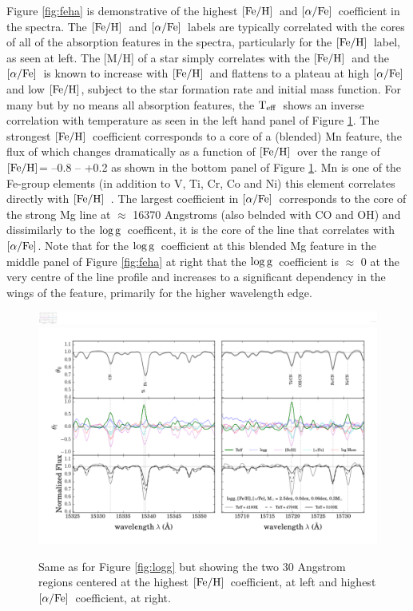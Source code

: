 \documentclass[12pt, preprint]{aastex}
\newcommand{\teff}{\mbox{$\rm T_{eff}$}}
\newcommand{\feh}{\mbox{$\rm [Fe/H]$}}
\newcommand{\alphafe}{\mbox{$\rm [\alpha/Fe]$}}
\newcommand{\logg}{\mbox{$\rm \log g$}}
\begin{document}
Figure \ref{fig:feha} is demonstrative of the highest \feh\ and \alphafe\ coefficient in the spectra. The \feh\ and \alphafe\ labels are typically correlated with the cores of all of the absorption features in the spectra, particularly for the \feh\ label, as seen at left. The [M/H] of  a star simply correlates with the \feh\ and the \alphafe\ is known to increase with \feh\ and flattens to a plateau at high \alphafe and low \feh, subject to the star formation rate and initial mass function. For many but by no means all absorption features, the \teff\ shows an inverse correlation with temperature as seen in the left hand panel of Figure \ref{fig:teff}. The strongest \feh\ coefficient corresponds to a core of a (blended) Mn feature, the flux of which changes dramatically as a function of \feh\ over the range of \feh = --0.8 -- +0.2 as shown in the bottom panel of Figure \ref{fig:teff}. Mn is one of the Fe-group elements (in addition to V, Ti, Cr, Co and Ni) this element correlates directly with \feh\ \citep[see][]{Maria2008, B2015}. The largest coefficient in \alphafe\ corresponds to the core of the strong Mg line at $\approx$ 16370 Angstroms (also belnded with CO and OH) and dissimilarly to the \logg\ coefficent, it is the core of the line that correlates with \alphafe. Note that for the \logg\ coefficient at this blended Mg feature in the middle panel of Figure \ref{fig:feha} at right that the \logg\ coefficient is $\approx$ 0 at the very centre of the line profile and increases to a significant dependency in the wings of the feature, primarily for the higher wavelength edge. 


\begin{figure}[p!]
\centering
    \includegraphics[scale=0.51]{./plots/coeffs_af_3.png}
    \includegraphics[scale=0.51]{./plots/coeffs_t_3.png}
  \caption{Same as for Figure \ref{fig:logg} but showing the two 30 Angstrom regions centered at the highest \feh\ coefficient, at left and highest \alphafe\ coefficient, at right.}
\label{fig:teff}
\end{figure}
\end{document}
